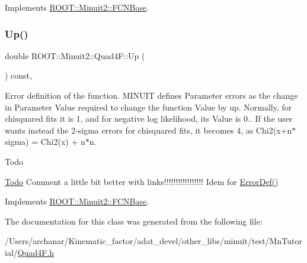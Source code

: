 Implements \mbox{\hyperlink{classROOT_1_1Minuit2_1_1FCNBase_ae4a86bd94d0d0f5ca6fc8f8ab2bb43cd}{R\+O\+O\+T\+::\+Minuit2\+::\+F\+C\+N\+Base}}.

\mbox{\label{classROOT_1_1Minuit2_1_1Quad4F_a19ebb5413722895a7635626cca02ebe9}} 
\subsubsection{\texorpdfstring{Up()}{Up()}}
{\footnotesize\ttfamily double R\+O\+O\+T\+::\+Minuit2\+::\+Quad4\+F\+::\+Up (\begin{DoxyParamCaption}{ }\end{DoxyParamCaption}) const\hspace{0.3cm}{\ttfamily [inline]}, {\ttfamily [virtual]}}

Error definition of the function. M\+I\+N\+U\+IT defines Parameter errors as the change in Parameter Value required to change the function Value by up. Normally, for chisquared fits it is 1, and for negative log likelihood, its Value is 0.. If the user wants instead the 2-\/sigma errors for chisquared fits, it becomes 4, as Chi2(x+n$\ast$sigma) = Chi2(x) + n$\ast$n.

\begin{DoxyRefDesc}{Todo}
\item[\mbox{\hyperlink{todo__todo000001}{Todo}}]Comment a little bit better with links!!!!!!!!!!!!!!!!! Idem for \mbox{\hyperlink{classROOT_1_1Minuit2_1_1FCNBase_ac4592475c58a65b037ba97ab5f3cba10}{Error\+Def()}}\end{DoxyRefDesc}


Implements \mbox{\hyperlink{classROOT_1_1Minuit2_1_1FCNBase_a04ef08ddad92ce8d89d498efbe021c39}{R\+O\+O\+T\+::\+Minuit2\+::\+F\+C\+N\+Base}}.



The documentation for this class was generated from the following file\+:\begin{DoxyCompactItemize}
\item 
/\+Users/archanar/\+Kinematic\+\_\+factor/adat\+\_\+devel/other\+\_\+libs/minuit/test/\+Mn\+Tutorial/\mbox{\hyperlink{Quad4F_8h}{Quad4\+F.\+h}}\end{DoxyCompactItemize}
